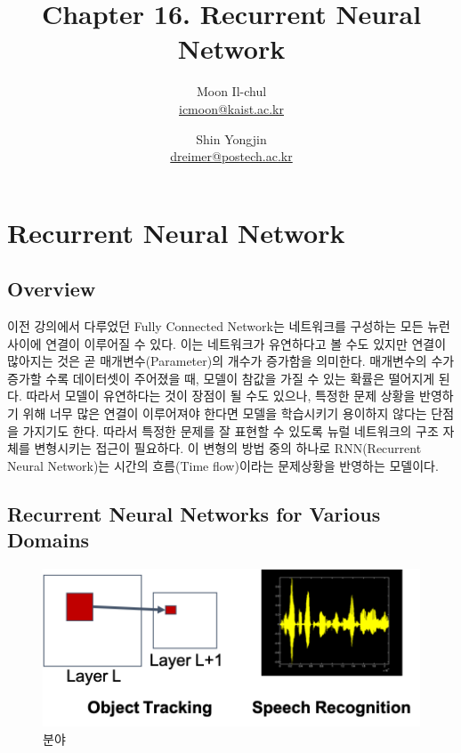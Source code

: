 \documentclass[draft=false]{oblivoir}
\author{Moon Il-chul \\ \href{mailto:icmoon@kaist.ac.kr}{icmoon@kaist.ac.kr} 
   \and Shin Yongjin \\ \href{mailto:dreimer@postech.ac.kr}{dreimer@postech.ac.kr} }
\title{Chapter 16. Recurrent Neural Network}
\begin{document}
\maketitle
\tableofcontents

\section{Recurrent Neural Network}

\subsection{Overview}
이전 강의에서 다루었던 Fully Connected Network는 네트워크를 구성하는 모든 뉴런 사이에 연결이 이루어질 수 있다. 이는 네트워크가 유연하다고 볼 수도 있지만 연결이 많아지는 것은 곧 매개변수(Parameter)의 개수가 증가함을 의미한다. 매개변수의 수가 증가할 수록 데이터셋이 주어졌을 때, 모델이 참값을 가질 수 있는 확률은 떨어지게 된다. 따라서 모델이 유연하다는 것이 장점이 될 수도 있으나, 특정한 문제 상황을 반영하기 위해 너무 많은 연결이 이루어져야 한다면 모델을 학습시키기 용이하지 않다는 단점을 가지기도 한다. 따라서 특정한 문제를 잘 표현할 수 있도록 뉴럴 네트워크의 구조 자체를 변형시키는 접근이 필요하다. 이 변형의 방법 중의 하나로 RNN(Recurrent Neural Network)는 시간의 흐름(Time flow)이라는 문제상황을 반영하는 모델이다.

\subsection{Recurrent Neural Networks for Various Domains}

\begin{figure}[ht] \centering 
  \includegraphics[scale=0.5]{fig1.png}
  \caption{분야}
  \label{fig:16-1}
\end{figure}
\end{document}
